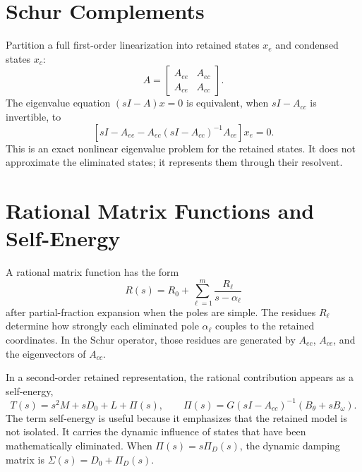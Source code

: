 \section{Schur Complements}

Partition a full first-order linearization into retained states \(x_e\) and
condensed states \(x_c\):
\begin{equation}
  A=
  \begin{bmatrix}
    A_{ee} & A_{ec}\\
    A_{ce} & A_{cc}
  \end{bmatrix}.
  \label{eq:prelim_partitioned_A}
\end{equation}
The eigenvalue equation \((sI-A)x=0\) is equivalent, when \(sI-A_{cc}\) is
invertible, to
\begin{equation}
  \left[sI-A_{ee}-A_{ec}(sI-A_{cc})^{-1}A_{ce}\right]x_e=0.
  \label{eq:prelim_schur}
\end{equation}
This is an exact nonlinear eigenvalue problem for the retained states. It does
not approximate the eliminated states; it represents them through their
resolvent.

\section{Rational Matrix Functions and Self-Energy}

A rational matrix function has the form
\begin{equation}
  R(s)=R_0+\sum_{\ell=1}^m \frac{R_\ell}{s-\alpha_\ell}
  \label{eq:prelim_rational}
\end{equation}
after partial-fraction expansion when the poles are simple. The residues
\(R_\ell\) determine how strongly each eliminated pole \(\alpha_\ell\) couples
to the retained coordinates. In the Schur operator, those residues are
generated by \(A_{ec}\), \(A_{ce}\), and the eigenvectors of \(A_{cc}\).

In a second-order retained representation, the rational contribution appears as
a self-energy,
\begin{equation}
  T(s)=s^2M+sD_0+L+\Pi(s),
  \qquad
  \Pi(s)=G(sI-A_{cc})^{-1}(B_\theta+sB_\omega).
  \label{eq:prelim_sigma}
\end{equation}
The term self-energy is useful because it emphasizes that the retained model is
not isolated. It carries the dynamic influence of states that have been
mathematically eliminated. When \(\Pi(s)=s\Pi_D(s)\), the dynamic damping
matrix is \(\Sigma(s)=D_0+\Pi_D(s)\).

